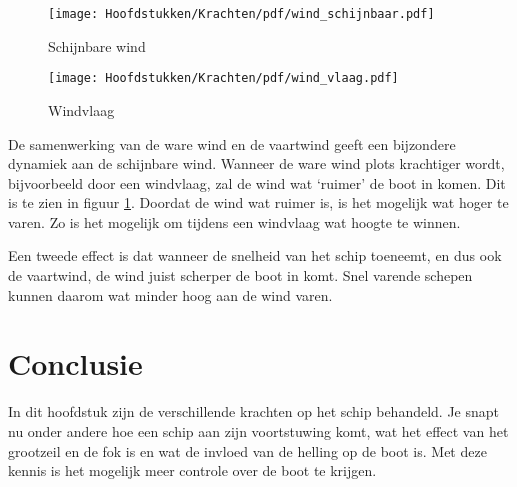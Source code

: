 \begin{figure}[H]
	\centering
	\begin{minipage}[b]{0.49\textwidth}
		\centering
		\texttt{[image: Hoofdstukken/Krachten/pdf/wind\_schijnbaar.pdf]}
		\caption{Schijnbare wind}
		\label{pic:schijnbare_wind}
	\end{minipage}
	\hfill
	\begin{minipage}[b]{0.49\textwidth}
		\centering
		\texttt{[image: Hoofdstukken/Krachten/pdf/wind\_vlaag.pdf]}
		\caption{Windvlaag}
		\label{pic:windvlaag}
	\end{minipage}
\end{figure}

De samenwerking van de ware wind en de vaartwind geeft een bijzondere dynamiek aan de schijnbare wind. Wanneer de ware wind plots krachtiger wordt, bijvoorbeeld door een windvlaag, zal de wind wat `ruimer' de boot in komen. Dit is te zien in figuur \ref{pic:windvlaag}. Doordat de wind wat ruimer is, is het mogelijk wat hoger te varen. Zo is het mogelijk om tijdens een windvlaag wat hoogte te winnen.

Een tweede effect is dat wanneer de snelheid van het schip toeneemt, en dus ook de vaartwind, de wind juist scherper de boot in komt. Snel varende schepen kunnen daarom wat minder hoog aan de wind varen.

\section{Conclusie}
In dit hoofdstuk zijn de verschillende krachten op het schip behandeld. Je snapt nu onder andere hoe een schip aan zijn voortstuwing komt, wat het effect van het grootzeil en de fok is en wat de invloed van de helling op de boot is. Met deze kennis is het mogelijk meer controle over de boot te krijgen.  
